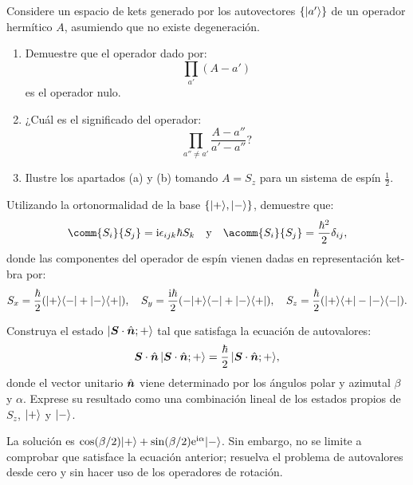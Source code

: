 \begin{enunciado}
Considere un espacio de kets generado por los autovectores $\{\lvert a'\rangle\}$ de un operador hermítico $A$, asumiendo que no existe degeneración.
\begin{enumerate}
  \item Demuestre que el operador dado por:
  \[
  \prod_{a'} (A - a')
  \]
  es el operador nulo.
  \item ¿Cuál es el significado del operador:
  \[
  \prod_{a'' \neq a'} \frac{A - a''}{a' - a''}?
  \]
  \item Ilustre los apartados (a) y (b) tomando $A = S_z$ para un sistema de espín $\frac{1}{2}$.
\end{enumerate}
\end{enunciado}

\begin{enunciado}
Utilizando la ortonormalidad de la base $\{\lvert+\rangle, \lvert-\rangle\}$, demuestre que:
\[
\comm{S_i}{S_j} = \ii \epsilon_{ijk} \hbar S_k \quad \text{y} \quad \acomm{S_i}{S_j} = \frac{\hbar^2}{2} \delta_{ij},
\]
donde las componentes del operador de espín vienen dadas en representación ket-bra por:
\[
S_x = \frac{\hbar}{2} (\lvert+\rangle\langle-\rvert + \lvert-\rangle\langle+\rvert), \quad
S_y = \frac{\mathrm{i}\hbar}{2} (-\lvert+\rangle\langle-\rvert + \lvert-\rangle\langle+\rvert), \quad
S_z = \frac{\hbar}{2} (\lvert+\rangle\langle+\rvert - \lvert-\rangle\langle-\rvert).
\]
\end{enunciado}

\begin{enunciado}
Construya el estado $\lvert\bm{S} \cdot \hat{\bm{n}}; +\rangle$ tal que satisfaga la ecuación de autovalores:
\[
\bm{S} \cdot \hat{\bm{n}} \, \lvert\bm{S} \cdot \hat{\bm{n}}; +\rangle = \frac{\hbar}{2} \, \lvert\bm{S} \cdot \hat{\bm{n}}; +\rangle,
\]
donde el vector unitario $\hat{\bm{n}}$ viene determinado por los ángulos polar y azimutal $\beta$ y $\alpha$. Exprese su resultado como una combinación lineal de los estados propios de $S_z$, $\lvert+\rangle$ y $\lvert-\rangle$.

\begin{nota}
La solución es $\cos(\beta/2)\lvert+\rangle + \sin(\beta/2)\mathrm{e}^{\mathrm{i}\alpha}\lvert-\rangle$. Sin embargo, no se limite a comprobar que satisface la ecuación anterior; resuelva el problema de autovalores desde cero y sin hacer uso de los operadores de rotación.
\end{nota}
\end{enunciado}


